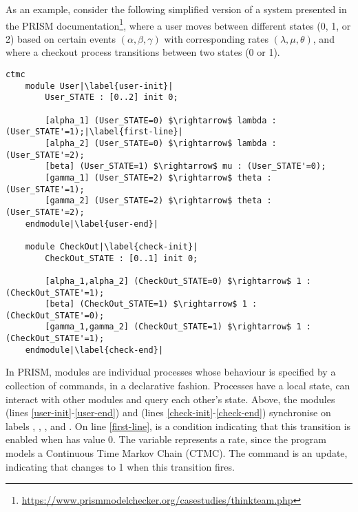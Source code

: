 As an example, consider the following simplified version of a system
presented in the PRISM
documentation\footnote{\url{https://www.prismmodelchecker.org/casestudies/thinkteam.php}},
where a user moves between different states (0, 1, or 2) based on
certain events $(\alpha, \beta, \gamma)$ with corresponding rates
$(\lambda, \mu, \theta)$, and where a checkout process transitions
between two states (0 or 1).
%
\begin{lstlisting}[style=prism-color,% caption={A PRISM example},captionpos=b,
  frame=none,label={example1},escapechar=|]
	ctmc 
	module User|\label{user-init}|
		User_STATE : [0..2] init 0;
	
		[alpha_1] (User_STATE=0) $\rightarrow$ lambda : (User_STATE'=1);|\label{first-line}|
		[alpha_2] (User_STATE=0) $\rightarrow$ lambda : (User_STATE'=2);
		[beta] (User_STATE=1) $\rightarrow$ mu : (User_STATE'=0);
		[gamma_1] (User_STATE=2) $\rightarrow$ theta : (User_STATE'=1);
		[gamma_2] (User_STATE=2) $\rightarrow$ theta : (User_STATE'=2);
	endmodule|\label{user-end}|
	
	module CheckOut|\label{check-init}|
		CheckOut_STATE : [0..1] init 0;
	
		[alpha_1,alpha_2] (CheckOut_STATE=0) $\rightarrow$ 1 : (CheckOut_STATE'=1);
		[beta] (CheckOut_STATE=1) $\rightarrow$ 1 : (CheckOut_STATE'=0);
		[gamma_1,gamma_2] (CheckOut_STATE=1) $\rightarrow$ 1 : (CheckOut_STATE'=1);
	endmodule|\label{check-end}|
\end{lstlisting}
%
In PRISM, modules are individual processes whose behaviour is
specified by a collection of commands, in a declarative fashion.
Processes have a local state, can interact with other modules and
query each other's state. Above, the modules  (lines
\ref{user-init}-\ref{user-end}) and  (lines
\ref{check-init}-\ref{check-end}) synchronise on labels
, , ,
 and . On line \ref{first-line},
 is a condition indicating that this
transition is enabled when  has value 0. The
variable  represents a rate, since the program
models a Continuous Time Markov Chain (CTMC). The command
 is an update, indicating that
 changes to 1 when this transition fires.

